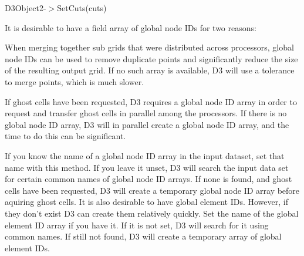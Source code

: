D3\-Object2-\/$>$Set\-Cuts(cuts)

It is desirable to have a field array of global node I\-Ds for two reasons\-:


\begin{DoxyEnumerate}
\item When merging together sub grids that were distributed across processors, global node I\-Ds can be used to remove duplicate points and significantly reduce the size of the resulting output grid. If no such array is available, D3 will use a tolerance to merge points, which is much slower.
\end{DoxyEnumerate}


\begin{DoxyEnumerate}
\item If ghost cells have been requested, D3 requires a global node I\-D array in order to request and transfer ghost cells in parallel among the processors. If there is no global node I\-D array, D3 will in parallel create a global node I\-D array, and the time to do this can be significant.
\end{DoxyEnumerate}

If you know the name of a global node I\-D array in the input dataset, set that name with this method. If you leave it unset, D3 will search the input data set for certain common names of global node I\-D arrays. If none is found, and ghost cells have been requested, D3 will create a temporary global node I\-D array before aquiring ghost cells. It is also desirable to have global element I\-Ds. However, if they don't exist D3 can create them relatively quickly. Set the name of the global element I\-D array if you have it. If it is not set, D3 will search for it using common names. If still not found, D3 will create a temporary array of global element I\-Ds.

